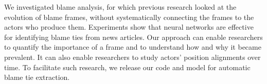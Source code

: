 \documentclass[letterpaper]{article} %
\begin{document}
We investigated blame analysis, for which previous research looked at the evolution of blame frames, without systematically connecting the frames to the actors who produce them. Experiments show that neural networks are effective for identifying blame ties from news articles.  Our approach can enable researchers to quantify the importance of a frame and to understand how and why it became prevalent. It can also enable researchers to study actors' position alignments over time. To facilitate such research, we release our code and model for automatic blame tie extraction.




\end{document}
